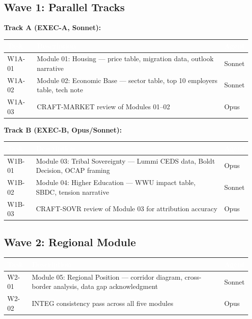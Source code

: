 \documentclass[11pt,letterpaper]{article}
\newcommand{\tableheader}[1]{\textbf{\sffamily\textcolor{white}{#1}}}
\begin{document}
\subsection{Wave 1: Parallel Tracks}

\textbf{Track A (EXEC-A, Sonnet):}

\begin{center}
\begin{tabularx}{\textwidth}{L{2cm}XC{2cm}}
\toprule
{}
\tableheader{Task} & \tableheader{Description} & \tableheader{Agent} \\
\midrule
W1A-01 & Module 01: Housing --- price table, migration data, outlook narrative & Sonnet \\
W1A-02 & Module 02: Economic Base --- sector table, top 10 employers table, tech note & Sonnet \\
W1A-03 & CRAFT-MARKET review of Modules 01--02 & Opus \\
\bottomrule
\end{tabularx}
\end{center}

\textbf{Track B (EXEC-B, Opus/Sonnet):}

\begin{center}
\begin{tabularx}{\textwidth}{L{2cm}XC{2cm}}
\toprule
{}
\tableheader{Task} & \tableheader{Description} & \tableheader{Agent} \\
\midrule
W1B-01 & Module 03: Tribal Sovereignty --- Lummi CEDS data, Boldt Decision, OCAP framing & Opus \\
W1B-02 & Module 04: Higher Education --- WWU impact table, SBDC, tension narrative & Sonnet \\
W1B-03 & CRAFT-SOVR review of Module 03 for attribution accuracy & Opus \\
\bottomrule
\end{tabularx}
\end{center}

\subsection{Wave 2: Regional Module}

\begin{center}
\begin{tabularx}{\textwidth}{L{2cm}XC{2cm}}
\toprule
{}
\tableheader{Task} & \tableheader{Description} & \tableheader{Agent} \\
\midrule
W2-01 & Module 05: Regional Position --- corridor diagram, cross-border analysis, data gap acknowledgment & Sonnet \\
W2-02 & INTEG consistency pass across all five modules & Opus \\
\bottomrule
\end{tabularx}
\end{center}
\end{document}
